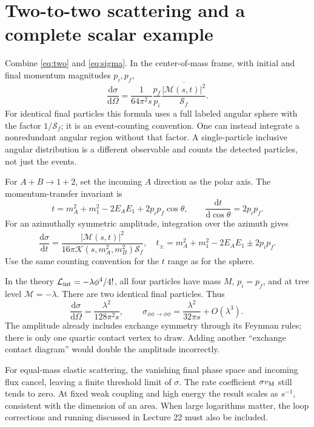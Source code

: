 \documentclass[11pt]{article}
\newcommand{\dd}{\mathrm d}
\newcommand{\Lag}{\mathcal L}
\newcommand{\module}[1]{\clearpage\section{#1}}
\newcommand{\cM}{\mathcal M}
\newcommand{\cS}{\mathcal S}
\newcommand{\Kallen}{\mathcal K}
\begin{document}
\module{Two-to-two scattering and a complete scalar example}
Combine \eqref{eq:two} and \eqref{eq:sigma}. In the center-of-mass frame,
with initial and final momentum magnitudes \(p_i,p_f\),
\begin{equation}
 \boxed{\quad\frac{\dd\sigma}{\dd\Omega}
 =\frac{1}{64\pi^2s}\frac{p_f}{p_i}
 \frac{\overline{|\cM(s,t)|^2}}{\cS_f}.\quad}
 \label{eq:dsdo}
\end{equation}
For identical final particles this formula uses a full labeled angular
sphere with the factor \(1/\cS_f\); it is an event-counting convention.
One can instead integrate a nonredundant angular region without that
factor. A single-particle inclusive angular distribution is a different
observable and counts the detected particles, not just the events.

For \(A+B\to1+2\), set the incoming \(A\) direction as the polar axis.
The momentum-transfer invariant is
\begin{equation}
 t=m_A^2+m_1^2-2E_AE_1+2p_ip_f\cos\theta,\qquad
 \frac{\dd t}{\dd\cos\theta}=2p_ip_f.
\end{equation}
For an azimuthally symmetric amplitude, integration over the azimuth gives
\begin{equation}
 \frac{\dd\sigma}{\dd t}
 =\frac{\overline{|\cM(s,t)|^2}}
 {16\pi\Kallen(s,m_A^2,m_B^2)\cS_f},
 \quad
 t_\pm=m_A^2+m_1^2-2E_AE_1\pm2p_ip_f.
 \label{eq:dsdt}
\end{equation}
Use the same counting convention for the \(t\) range as for the sphere.

In the theory \(\Lag_{\rm int}=-\lambda\phi^4/4!\), all four particles
have mass \(M\), \(p_i=p_f\), and at tree level \(\cM=-\lambda\).
There are two identical final particles. Thus
\begin{equation}
 \frac{\dd\sigma}{\dd\Omega}=\frac{\lambda^2}{128\pi^2s},\qquad
 \boxed{\ \sigma_{\phi\phi\to\phi\phi}
 =\frac{\lambda^2}{32\pi s}+O(\lambda^3).\ }
 \label{eq:quarticsigma}
\end{equation}
The amplitude already includes exchange symmetry through its Feynman
rules; there is only one quartic contact vertex to draw. Adding another
``exchange contact diagram'' would double the amplitude incorrectly.

\begin{remarkbox}
For equal-mass elastic scattering, the vanishing final phase space and
incoming flux cancel, leaving a finite threshold limit of \(\sigma\).
The rate coefficient \(\sigma v_{\rm M}\) still tends to zero. At fixed
weak coupling and high energy the result scales as \(s^{-1}\), consistent
with the dimension of an area. When large logarithms matter, the loop
corrections and running discussed in Lecture 22 must also be included.
\end{remarkbox}
\end{document}
